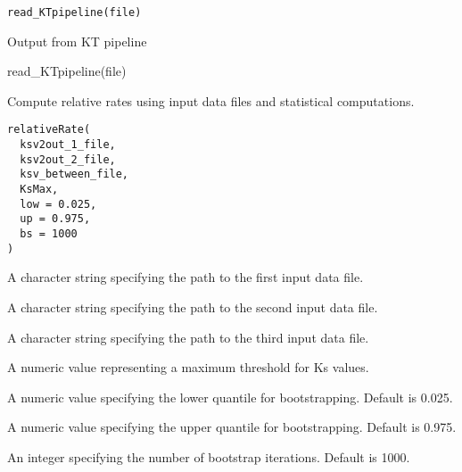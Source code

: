 \documentclass[a4paper]{book}
\begin{document}
%
\begin{Usage}
\begin{verbatim}
read_KTpipeline(file)
\end{verbatim}
\end{Usage}
%
\begin{Arguments}
\begin{ldescription}
\item[\code{file}] Output from KT pipeline
\end{ldescription}
\end{Arguments}
%
\begin{Examples}
\begin{ExampleCode}
read_KTpipeline(file)
\end{ExampleCode}
\end{Examples}
%
\begin{Description}\relax
Compute relative rates using input data files and statistical computations.
\end{Description}
%
\begin{Usage}
\begin{verbatim}
relativeRate(
  ksv2out_1_file,
  ksv2out_2_file,
  ksv_between_file,
  KsMax,
  low = 0.025,
  up = 0.975,
  bs = 1000
)
\end{verbatim}
\end{Usage}
%
\begin{Arguments}
\begin{ldescription}
\item[\code{ksv2out\_1\_file}] A character string specifying the path to the first input data file.

\item[\code{ksv2out\_2\_file}] A character string specifying the path to the second input data file.

\item[\code{ksv\_between\_file}] A character string specifying the path to the third input data file.

\item[\code{KsMax}] A numeric value representing a maximum threshold for Ks values.

\item[\code{low}] A numeric value specifying the lower quantile for bootstrapping. Default is 0.025.

\item[\code{up}] A numeric value specifying the upper quantile for bootstrapping. Default is 0.975.

\item[\code{bs}] An integer specifying the number of bootstrap iterations. Default is 1000.
\end{ldescription}
\end{Arguments}
\end{document}
